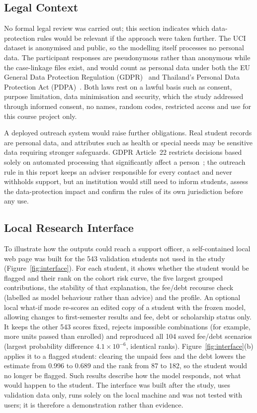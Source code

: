 \subsection{Legal Context}
\label{sec:app-legal}

No formal legal review was carried out; this section indicates which data-protection rules would be
relevant if the approach were taken further. The UCI dataset is anonymised and public, so the
modelling itself processes no personal data. The participant responses are pseudonymous rather than
anonymous while the case-linkage files exist, and would count as personal data under both the EU
General Data Protection Regulation (GDPR)~\citep{gdpr2016} and Thailand's Personal Data Protection
Act (PDPA)~\citep{pdpa2019}. Both laws rest on a lawful basis such as consent, purpose limitation,
data minimisation and security, which the study addressed through informed consent, no names, random
codes, restricted access and use for this course project only.

A deployed outreach system would raise further obligations. Real student records are personal data,
and attributes such as health or special needs may be sensitive data requiring stronger safeguards.
GDPR Article~22 restricts decisions based solely on automated processing that significantly affect a
person~\citep{gdpr2016,wachter2017counterfactual}; the outreach rule in this report keeps an adviser
responsible for every contact and never withholds support, but an institution would still need to
inform students, assess the data-protection impact and confirm the rules of its own jurisdiction
before any use.

\subsection{Local Research Interface}
\label{sec:app-interface}

To illustrate how the outputs could reach a support officer, a self-contained local web page was
built for the 543 validation students not used in the study (Figure~\ref{fig:interface}). For each
student, it shows whether the student would be flagged and their rank on the cohort risk curve, the
five largest grouped contributions, the stability of that explanation, the fee/debt recourse check
(labelled as model behaviour rather than advice) and the profile. An optional local what-if mode
re-scores an edited copy of a student with the frozen model, allowing changes to first-semester
results and fee, debt or scholarship status only. It keeps the other 543 scores fixed, rejects
impossible combinations (for example, more units passed than enrolled) and reproduced all 104 saved
fee/debt scenarios (largest probability difference $4.1\times10^{-6}$, identical ranks).
Figure~\ref{fig:interface}(b) applies it to a flagged student: clearing the unpaid fees and the debt
lowers the estimate from 0.996 to 0.689 and the rank from 87 to 182, so the student would no longer be
flagged. Such results describe how the model responds, not what would happen to the student. The
interface was built after the study, uses validation data only, runs solely on the local machine and
was not tested with users; it is therefore a demonstration rather than evidence.

